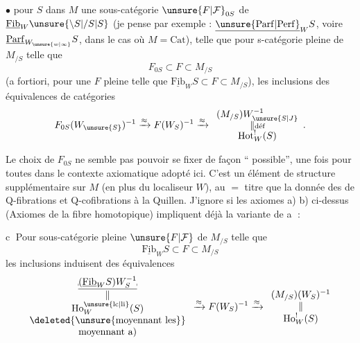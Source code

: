 $\bullet$ pour  $S$ dans $M$ une sous-catégorie $\unsure{F|\mathcal F}_{0S}$ de $\underline{\mathrm{Fib}}_{W}\unsure{\backslash S|/S|S}$ (je pense par exemple : $\underline{\unsure{\mathrm{Parf}|\mathrm{Perf}}}_{W}S$, voire $\underline{\mathrm{Parf}}_{W_{\unsure{w|\infty}}}S$, dans le cas où $M=\mathrm{Cat}$), telle que pour  s-catégorie pleine  de $M_{/S}$ telle que
\[
F_{0S}\subset F\subset M_{/S}
\]
(a fortiori, pour une $F$ pleine telle que $\underline{\mathrm{Fib}}_{W}S\subset F\subset M_{/S}$), les inclusions   des équivalences de catégories
\[
F_{0S}(W_{\unsure{S}})^{-1}\xrightarrow{\approx}
F(W_S)^{-1}\xrightarrow{\approx}
\begin{array}{c}
(M_{/S})W_{\unsure{S|J}}^{-1}\\[-2pt]
\Vert\scriptstyle{\text{déf}}\\[-2pt]
\mathrm{Hot}^{!}_{W}(S)
\end{array}.
\]

Le choix de $F_{0S}$ ne semble pas pouvoir se fixer de façon `` possible'', une fois pour toutes dans le contexte axiomatique adopté ici. C'est un élément de structure supplémentaire sur $M$ (en plus du localiseur $W$), au $=$ titre que la donnée des  de Q-fibrations et Q-cofibrations à la Quillen. J'ignore si les axiomes a) b) ci-dessus (Axiomes de la fibre homotopique) impliquent déjà
la variante de \textcircled{a} :

\textcircled{c} Pour  sous-catégorie pleine $\unsure{F|\mathcal F}$ de $M_{/S}$ telle que
\[
\underline{\mathrm{Fib}}_{W}S\subset F\subset M_{/S}
\]
les inclusions induisent des équivalences
\[
\begin{array}{c}
\underline{\rule[-.24ex]{.08ex}{.48ex}\vphantom{F}(\underline{\mathrm{Fib}}_W S)W_S^{-1}\rule[-.24ex]{.08ex}{.48ex}}\\
\Vert\\
\mathrm{Ho}^{\unsure{\mathrm{lc}|\mathrm{li}}}_{W}(S)\\
\text{\deleted{\unsure{moyennant les}}}\\
\text{moyennant a)}
\end{array}
\xrightarrow{\approx} F(W_S)^{-1}
\xrightarrow{\approx}
\begin{array}{c}(M_{/S})(W_{S})^{-1}\\ \Vert\\ \mathrm{Ho}^{!}_{W}(S)\end{array}
\]

